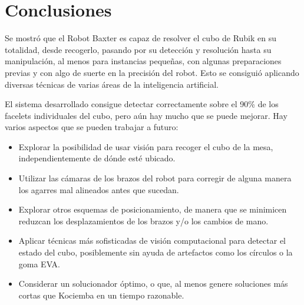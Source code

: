 \chapter{Conclusiones}

Se mostró que el Robot Baxter es capaz de resolver el cubo de Rubik en su totalidad, desde recogerlo, pasando por su detección y resolución hasta su manipulación, al menos para instancias pequeñas, con algunas preparaciones previas y con algo de suerte en la precisión del robot. Esto se consiguió aplicando diversas técnicas de varias áreas de la inteligencia artificial.

El sistema desarrollado consigue detectar correctamente sobre el 90\% de los facelets individuales del cubo, pero aún hay mucho que se puede mejorar. Hay varios aspectos que se pueden trabajar a futuro:
\begin{itemize}
	\item Explorar la posibilidad de usar visión para recoger el cubo de la mesa, independientemente de dónde esté ubicado.
	\item Utilizar las cámaras de los brazos del robot para corregir de alguna manera los agarres mal alineados antes que sucedan.
	\item Explorar otros esquemas de posicionamiento, de manera que se minimicen reduzcan los desplazamientos de los brazos y/o los cambios de mano.
	\item Aplicar técnicas más sofisticadas de visión computacional para detectar el estado del cubo, posiblemente sin ayuda de artefactos como los círculos o la goma EVA.
	\item Considerar un solucionador óptimo, o que, al menos genere soluciones más cortas que Kociemba en un tiempo razonable.
\end{itemize}
